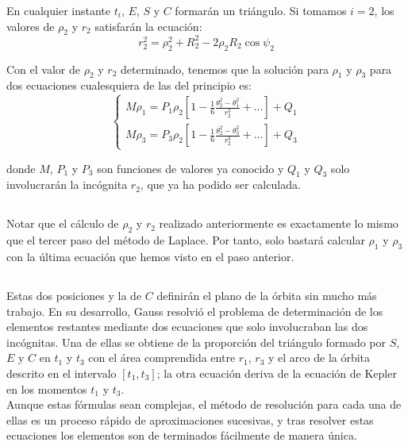 \documentclass[11pt]{article}
\begin{document}
En cualquier instante $t_i$, $E$, $S$ y $C$ formarán un triángulo. Si tomamos $i=2$, los valores de $\rho_2$ y $r_2$ satisfarán la ecuación:
\[
r_2^2=\rho_2^2+R_2^2-2\rho_2R_2\cos{\psi_2}
\]

Con el valor de $\rho_2$ y $r_2$ determinado, tenemos que la solución para $\rho_1$ y $\rho_3$ para dos ecuaciones cualesquiera de las del principio es:
\[
\left\{
\begin{array}{l}
	M\rho_1=P_1\rho_2[1-\frac{1}{6}\frac{\theta_2^2-\theta_1^2}{r_2^3}+...]+Q_1\\
	M\rho_3=P_3\rho_2[1-\frac{1}{6}\frac{\theta_2^2-\theta_3^2}{r_2^3}+...]+Q_3
\end{array}
\right.
\]

\noindent donde $M$, $P_1$ y $P_3$ son funciones de valores ya conocido y $Q_1$ y $Q_3$ solo involucrarán la incógnita $r_2$, que ya ha podido ser calculada.\\

\subsection{}
Notar que el cálculo de $\rho_2$ y $r_2$ realizado anteriormente es exactamente lo mismo que el tercer paso del método de Laplace. Por tanto, solo bastará calcular $\rho_1$ y $\rho_3$ con la última ecuación que hemos visto en el paso anterior.\\

\subsection{}
Estas dos posiciones y la de $C$ definirán el plano de la órbita sin mucho más trabajo. En su desarrollo, Gauss resolvió el problema de determinación de los elementos restantes mediante dos ecuaciones que solo involucraban las dos incógnitas. Una de ellas se obtiene de la proporción del triángulo formado por $S$, $E$ y $C$ en $t_1$ y $t_3$ con el área comprendida entre $r_1$, $r_3$ y el arco de la órbita descrito en el intervalo $[t_1,t_3]$; la otra ecuación deriva de la ecuación de Kepler en los momentos $t_1$ y $t_3$.\\

Aunque estas fórmulas sean complejas, el método de resolución para cada una de ellas es un proceso rápido de aproximaciones sucesivas, y tras resolver estas ecuaciones los elementos son de terminados fácilmente de manera única.\\
\fi
\end{document}
